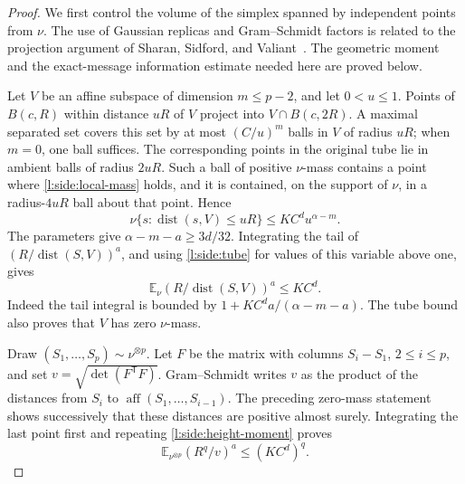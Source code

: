 \begin{proof}
We first control the volume of the simplex spanned by independent
points from $\nu$.  The use of Gaussian replicas and Gram--Schmidt
factors is related to the projection argument of Sharan, Sidford, and
Valiant~\cite[Section~7, Lemma~12]{SSV2019}.  The geometric moment and
the exact-message information estimate needed here are proved below.

Let $V$ be an affine subspace of dimension $m\le p-2$, and let
$0<u\le1$.  Points of $B(c,R)$ within distance $uR$ of $V$ project into
$V\cap B(c,2R)$.  A maximal separated set covers this set by at most
$(C/u)^m$ balls in $V$ of radius $uR$; when $m=0$, one ball suffices.
The corresponding points in the original tube lie in ambient balls of
radius $2uR$.  Such a ball of positive $\nu$-mass contains a point where
\eqref{l:side:local-mass} holds, and it is contained, on the support of
$\nu$, in a radius-$4uR$ ball about that point.  Hence
\begin{equation}\label{l:side:tube}
 \nu\{s:\operatorname{dist}(s,V)\le uR\}
 \le KC^d u^{\alpha-m}.
\end{equation}
The parameters give $\alpha-m-a\ge3d/32$.  Integrating the tail of
$(R/\operatorname{dist}(S,V))^a$, and using
\eqref{l:side:tube} for values of this variable above one, gives
\begin{equation}\label{l:side:height-moment}
 \mathbb E_\nu (R/\operatorname{dist}(S,V))^a\le KC^d.
\end{equation}
Indeed the tail integral is bounded by
$1+KC^d a/(\alpha-m-a)$.  The tube bound also proves that $V$ has
zero $\nu$-mass.

Draw $(S_1,\ldots,S_p)\sim\nu^{\otimes p}$.  Let $F$ be the matrix
with columns $S_i-S_1$, $2\le i\le p$, and set
$v=\sqrt{\det(F^{\mathsf T}F)}$.  Gram--Schmidt writes $v$ as the
product of the distances from $S_i$ to
$\operatorname{aff}(S_1,\ldots,S_{i-1})$.  The preceding zero-mass
statement shows successively that these distances are positive almost
surely.  Integrating the last point first and repeating
\eqref{l:side:height-moment} proves
\begin{equation}\label{l:side:gram-moment}
 \mathbb E_{\nu^{\otimes p}}(R^q/v)^a\le(KC^d)^q.
\end{equation}


\end{proof}
